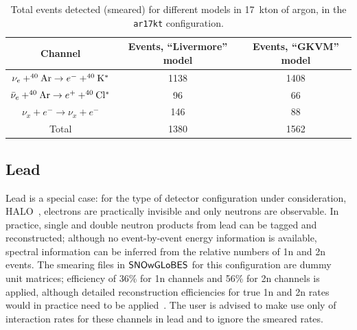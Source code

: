 \documentclass[12pt]{article}
\newcommand{\snowglobes}{\sf{SNOwGLoBES}}
\begin{document}
\begin{table}[h]
\centering
\begin{tabular}{|c|c|c|} \hline
Channel & Events, ``Livermore'' model & Events, ``GKVM'' model  \\
\hline

$\nu_e + ^{40}{\rm Ar} \rightarrow e^- + ^{40}{\rm K^*}$ & 1138  & 1408 \\

$\bar{\nu}_e + ^{40}{\rm Ar} \rightarrow e^+ + ^{40}{\rm Cl^*}$ & 96& 66\\

$\nu_x + e^- \rightarrow \nu_x + e^-$                           & 146 &   88\\

\hline

Total &  1380 & 1562 \\ \hline
\end{tabular}
\caption{Total events detected (smeared) for different models in 17~kton of argon, in the \texttt{ar17kt} configuration.}
\label{tab:lartable}
\end{table}



\subsection{Lead}

Lead is a special case: for the type of detector configuration under
consideration, HALO~\cite{Duba:2008zz}, electrons are practically invisible
and only neutrons are observable.  In practice, single and double
neutron products from lead can be tagged and reconstructed; although
no event-by-event energy information is available, spectral information can be
inferred from the relative numbers of 1n and 2n events.  The smearing
files in $\snowglobes$ for this configuration are dummy unit matrices;
efficiency of 36\% for 1n channels and 56\% for 2n channels is
applied, although detailed reconstruction efficiencies for true 1n and
2n rates would in practice need to be applied~\cite{halo}.  The user is
advised to make use only of interaction rates for these channels in
lead and to ignore the smeared rates.
\end{document}
